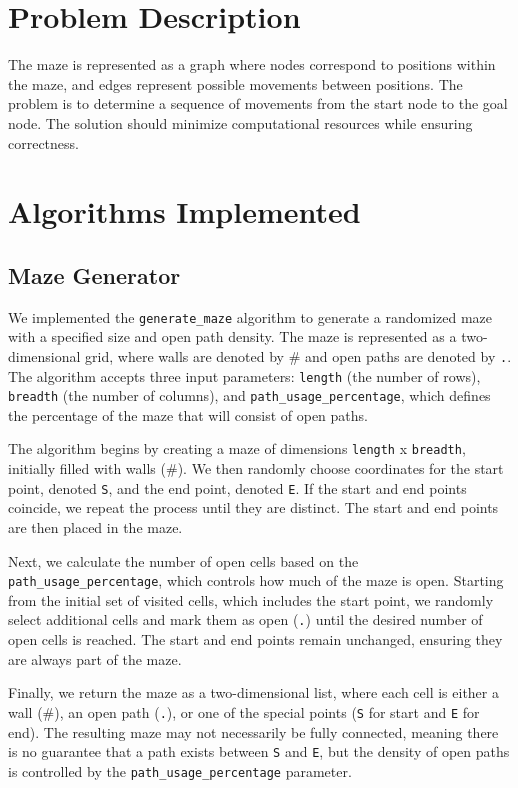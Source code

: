 \documentclass[final, journal, 11pt]{report}
\begin{document}
	
	\section*{Problem Description}
	The maze is represented as a graph where nodes correspond to positions within the maze, and edges represent possible movements between positions. The problem is to determine a sequence of movements from the start node to the goal node. The solution should minimize computational resources while ensuring correctness.
	
	\section*{Algorithms Implemented}
	
	\subsection*{Maze Generator}
	
	We implemented the \texttt{generate\_maze} algorithm to generate a randomized maze with a specified size and open path density. The maze is represented as a two-dimensional grid, where walls are denoted by \# and open paths are denoted by \texttt{.}. The algorithm accepts three input parameters: \texttt{length} (the number of rows), \texttt{breadth} (the number of columns), and \texttt{path\_usage\_percentage}, which defines the percentage of the maze that will consist of open paths. 
	
	The algorithm begins by creating a maze of dimensions \texttt{length} x \texttt{breadth}, initially filled with walls (\#). We then randomly choose coordinates for the start point, denoted \texttt{S}, and the end point, denoted \texttt{E}. If the start and end points coincide, we repeat the process until they are distinct. The start and end points are then placed in the maze.
	
	Next, we calculate the number of open cells based on the \texttt{path\_usage\_percentage}, which controls how much of the maze is open. Starting from the initial set of visited cells, which includes the start point, we randomly select additional cells and mark them as open (\texttt{.}) until the desired number of open cells is reached. The start and end points remain unchanged, ensuring they are always part of the maze.
	
	Finally, we return the maze as a two-dimensional list, where each cell is either a wall (\#), an open path (\texttt{.}), or one of the special points (\texttt{S} for start and \texttt{E} for end). The resulting maze may not necessarily be fully connected, meaning there is no guarantee that a path exists between \texttt{S} and \texttt{E}, but the density of open paths is controlled by the \texttt{path\_usage\_percentage} parameter.
	
\end{document}
